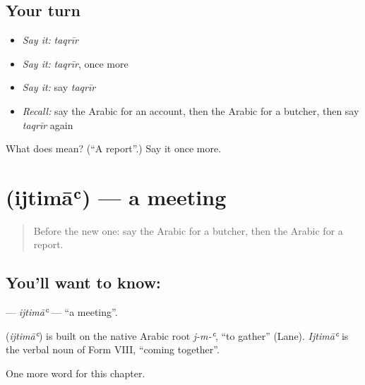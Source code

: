 \subsection*{Your turn}
\begin{itemize}
\raggedright
  \item \emph{Say it:} \emph{taqrīr}
  \item \emph{Say it:} \emph{taqrīr}, once more
  \item \emph{Say it:} say \emph{taqrīr}
  \item \emph{Recall:} say the Arabic for an account, then the Arabic for a butcher, then say \emph{taqrīr} again
\end{itemize}

\begin{tcolorbox}[breakable,colback=teal!4,colframe=teal!35!black,title={Before you move on}]
What does  mean? (\textquotedblleft{}A report\textquotedblright{}.) Say it once more.
\end{tcolorbox}
\section[\texorpdfstring{\ar{اجتماع} (ijtimāʿ)}{اجتماع (ijtimāʿ)}]{ (ijtimāʿ) — a meeting}

\label{lesson:AR-C221-ijtima}



\begin{quote}
Before the new one: say the Arabic for a butcher, then the Arabic for a report.
\end{quote}

\subsection*{You'll want to know: }
\textbf{} — \emph{ijtimāʿ} — \textquotedblleft{}a meeting\textquotedblright{}.

\begin{cousinweb}
\textbf{} (\emph{ijtimāʿ}) is built on the native Arabic root \emph{j-m-ʿ}, \textquotedblleft{}to gather\textquotedblright{} (Lane). \emph{Ijtimāʿ} is the verbal noun of Form VIII, \textquotedblleft{}coming together\textquotedblright{}.
\end{cousinweb}

\begin{grammarlens}[title={What you've built}]
One more word for this chapter.
\end{grammarlens}

